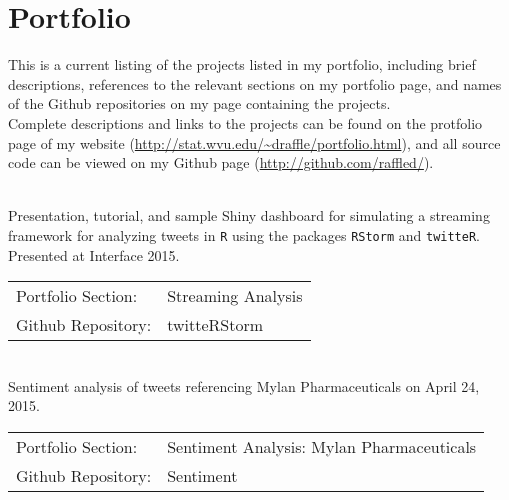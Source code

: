 \documentclass[letterpaper]{deedy-resume} %
\begin{document}

\lastupdated %


\section{Portfolio}
\begin{flushleft}
This is a current listing of the projects listed in my portfolio,
including brief descriptions, references to the relevant
sections on my portfolio page, and names of the Github repositories on
my page containing the projects.\\
\vspace{8pt}
Complete descriptions and links to the projects can be found on the
protfolio page of my website
(\url{http://stat.wvu.edu/~draffle/portfolio.html}),
and all source code can be viewed on my Github page 
(\url{http://github.com/raffled/}).

\vspace{10pt}
\\
Presentation, tutorial, and sample Shiny dashboard for
simulating a streaming framework for analyzing tweets in \texttt{R}
using the packages \texttt{RStorm} and \texttt{twitteR}.
Presented at Interface 2015.
\vspace{10pt}

\begin{tabular}{l l}
  Portfolio Section: & Streaming Analysis\\
  Github Repository: & twitteRStorm\\
\end{tabular}
\vspace{10pt}

\\
Sentiment analysis of tweets referencing Mylan Pharmaceuticals on April 24, 2015.
\vspace{10pt}

\begin{tabular}{l  l}
  Portfolio Section: & Sentiment Analysis: Mylan Pharmaceuticals\\
  Github Repository: & Sentiment\\
\end{tabular}
\vspace{10pt}


\end{flushleft}
\end{document}
